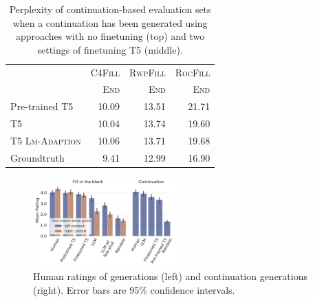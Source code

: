 \begin{table}[t]
    \caption{Perplexity of continuation-based evaluation sets when a continuation has been generated using approaches with no finetuning (top) and two settings of finetuning T5 (middle).}
    \label{tab:generative_ppl_continuation_results}
    \centering
    \small
    \begin{tabular}{l|rrr}
    \toprule
    & \textsc{C4Fill} & \textsc{RwpFill} & \textsc{RocFill} \\
    & \textsc{End} & \textsc{End} & \textsc{End}  \\
    \midrule
    {Pre-trained T5}  & 10.09 & 13.51 & 21.71 \\
    \midrule
    {T5 \FITBFITE{}} & 10.04 & 13.74 & 19.60 \\
    {T5 \textsc{Lm-Adaption}} & 10.06  & 13.71 & 19.68 \\
    \midrule
    {Groundtruth} & 9.41 & 12.99 & 16.90 \\
    \bottomrule
    \end{tabular}
\end{table}

\begin{figure}[t]
    \centering
    \includegraphics[width=0.49\textwidth, trim={0 0.55cm 0 0}, clip]{figures/human_eval}
    \vspace{-1.75em}
    \caption{Human ratings of \FitB{} generations (left) and continuation generations (right). Error bars are 95\% confidence intervals.}
    \label{fig:human_eval_results}
\end{figure}

